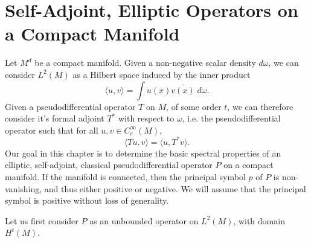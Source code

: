 \chapter{Self-Adjoint, Elliptic Operators on a Compact Manifold}

Let $M^d$ be a compact manifold. Given a non-negative scalar density $d\omega$, we can consider $L^2(M)$ as a Hilbert space induced by the inner product
%
\[ \langle u, v \rangle = \int u(x) \overline{v(x)}\; d\omega. \]
%
Given a pseudodifferential operator $T$ on $M$, of some order $t$, we can therefore consider it's formal adjoint $T^*$ with respect to $\omega$, i.e. the pseudodifferential operator such that for all $u,v \in C_c^\infty(M)$,
%
\[ \langle Tu, v \rangle = \langle u, T^* v \rangle. \]
%
Our goal in this chapter is to determine the basic spectral properties of an elliptic, self-adjoint, classical pseudodifferential operator $P$ on a compact manifold. If the manifold is connected, then the principal symbol $p$ of $P$ is non-vanishing, and thus either positive or negative. We will assume that the principal symbol is positive without loss of generality.

Let us first consider $P$ as an unbounded operator on $L^2(M)$, with domain $H^t(M)$.

%
%
%
%

